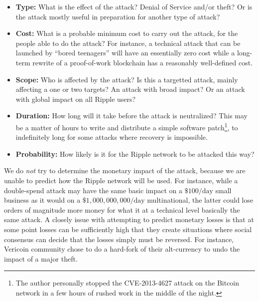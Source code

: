 \documentclass{article}
\begin{document}
\begin{itemize}

    \item \textbf{Type:} What is the effect of the attack? Denial of Service
          and/or theft? Or is the attack mostly useful in preparation for another
          type of attack?

    \item \textbf{Cost:} What is a probable minimum cost to carry out the attack, for
          the people able to do the attack? For instance, a technical attack
          that can be launched by ``bored teenagers'' will have an essentially
          zero cost while a long-term rewrite of a proof-of-work blockchain has
          a reasonably well-defined cost.

    \item \textbf{Scope:} Who is affected by the attack? Is this a targetted attack,
          mainly affecting a one or two targets? An attack with broad impact? Or
          an attack with global impact on all Ripple users?

    \item \textbf{Duration:} How long will it take before the attack is
          neutralized?  This may be a matter of hours to write and distribute a
          simple software patch\footnote{The author personally stopped the
          CVE-2013-4627 attack on the Bitcoin network in a few hours of rushed
          work in the middle of the night.}, to indefinitely long for some
          attacks where recovery is impossible.

    \item \textbf{Probability:} How likely is it for the Ripple network to be
          attacked this way?

\end{itemize}

We do \emph{not} try to determine the monetary impact of the attack, because we
are unable to predict how the Ripple network will be used. For instance, while
a double-spend attack may have the same basic impact on a $\$100/\text{day}$
small business as it would on a $\$1,000,000,000/\text{day}$ multinational, the
latter could lose orders of magnitude more money for what it at a technical
level basically the same attack. A closely issue with attempting to predict
monetary losses is that at some point losses can be sufficiently high that they
create situations where social consensus can decide that the losses simply must
be reversed. For instance, Vericoin community chose to do a hard-fork of their
alt-currency to undo the impact of a major theft.\cite{coindesk-vericoin}
\end{document}
